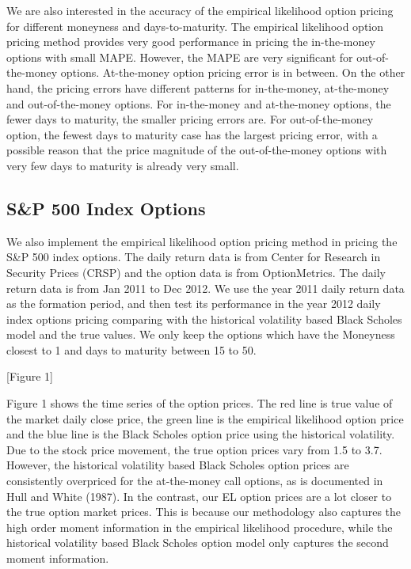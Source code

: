 \documentclass[oneside,english]{amsbook}
\numberwithin{section}{chapter}
\numberwithin{equation}{section}
\numberwithin{figure}{section}
\theoremstyle{plain}
\theoremstyle{plain}
\theoremstyle{definition}
\theoremstyle{plain}
\theoremstyle{plain}
\theoremstyle{remark}
\theoremstyle{definition}
\theoremstyle{definition}
\begin{document}
We are also interested in the accuracy of the empirical likelihood option pricing for different moneyness and days-to-maturity. The empirical likelihood option pricing method provides very good performance in pricing the in-the-money options with small MAPE. However, the MAPE are very significant for out-of-the-money options. At-the-money option pricing error is in between. On the other hand, the pricing errors have different patterns for in-the-money, at-the-money and out-of-the-money options. For in-the-money and at-the-money options, the fewer days to maturity, the smaller pricing errors are. For out-of-the-money option, the fewest days to maturity case has the largest pricing error, with a possible reason that the price magnitude of the out-of-the-money options with very few days to maturity is already very small.  

\subsection{S\&P 500 Index Options}

We also implement the empirical likelihood option pricing method in pricing the S\&P 500 index options. The daily return data is from Center for Research in Security Prices (CRSP) and the option data is from OptionMetrics. The daily return data is from Jan 2011 to Dec 2012. We use the year 2011 daily return data as the formation period, and then test its performance in the year 2012 daily index options pricing comparing with the historical volatility based Black Scholes model and the true values. We only keep the options which have the Moneyness closest to 1 and days to maturity between 15 to 50. 
\begin{center}
[Figure 1]
\end{center}

Figure 1 shows the time series of the option prices. The red line is true value of the market daily close price, the green line is the empirical likelihood option price and the blue line is the Black Scholes option price using the historical volatility. Due to the stock price movement, the true option prices vary from 1.5 to 3.7. However, the historical volatility based Black Scholes option prices are consistently overpriced for the at-the-money call options, as is documented in Hull and White (1987).  In the contrast, our EL option prices are a lot closer to the true option market prices. This is because our methodology also captures the high order moment information in the empirical likelihood procedure, while the historical volatility based Black Scholes option model only captures the second moment information.   
\end{document}

